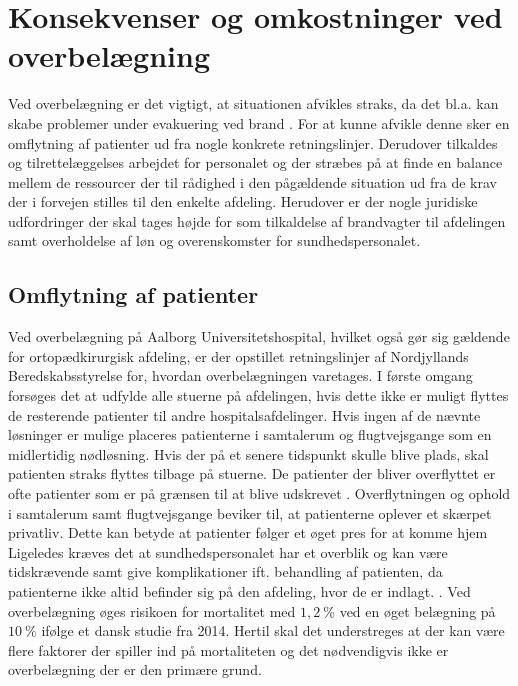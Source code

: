 \section{Konsekvenser og omkostninger ved overbelægning}
Ved overbelægning er det vigtigt, at situationen afvikles straks, da det bl.a. kan skabe problemer under evakuering ved brand . \cite{Madsen2014} For at kunne afvikle denne sker en omflytning af patienter ud fra nogle konkrete retningslinjer. Derudover tilkaldes og tilrettelæggelses arbejdet for personalet og der stræbes på at finde en balance mellem de ressourcer der til rådighed i den pågældende situation ud fra de krav der i forvejen stilles til den enkelte afdeling. Herudover er der nogle juridiske udfordringer der skal tages højde for som tilkaldelse af brandvagter til afdelingen samt overholdelse af løn og overenskomster for sundhedspersonalet. 


\subsection{Omflytning af patienter}
Ved overbelægning på Aalborg Universitetshospital, hvilket også gør sig gældende for ortopædkirurgisk afdeling, er der opstillet retningslinjer af Nordjyllands Beredskabsstyrelse for, hvordan overbelægningen varetages. I første omgang forsøges det at udfylde alle stuerne på afdelingen, hvis dette ikke er muligt flyttes de resterende patienter til andre hospitalsafdelinger. Hvis ingen af de nævnte løsninger er mulige placeres patienterne i samtalerum og flugtvejsgange som en midlertidig nødløsning. Hvis der på et senere tidspunkt skulle blive plads, skal patienten straks flyttes tilbage på stuerne. \cite{Beredskab2016} De patienter der bliver overflyttet er ofte patienter som er på grænsen til at blive udskrevet .
Overflytningen og ophold i samtalerum samt flugtvejsgange beviker til, at patienterne oplever et skærpet privatliv. \cite{Madsen2014} Dette kan betyde at patienter følger et øget pres for at komme hjem 
Ligeledes kræves det at  sundhedspersonalet har et overblik og kan være tidskrævende samt give komplikationer ift. behandling af patienten, da patienterne ikke altid befinder sig på den afdeling, hvor de er indlagt. . Ved overbelægning øges risikoen for mortalitet med $1,2~\%$ ved en øget belægning på $10~\%$ ifølge et dansk studie fra 2014. Hertil skal det understreges at der kan være flere faktorer der spiller ind på mortaliteten og det nødvendigvis ikke er overbelægning der er den primære grund. 


